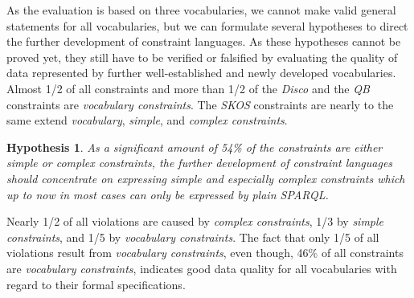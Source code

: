 \documentclass{llncs}
\newcommand{\tb}[1]{\todo[size=\small, color=green!40]{\textbf{Thomas:} #1}}
\newtheorem{hyp}{Hypothesis}
\begin{document}
As the evaluation is based on three vocabularies, 
we cannot make valid general statements for all vocabularies,
but we can formulate several hypotheses to direct the further development of constraint languages.
As these hypotheses cannot be proved yet, 
they still have to be verified or falsified
by evaluating the quality of data represented by further well-established and newly developed vocabularies.
Almost 1/2 of all constraints and more than 1/2 of the \emph{Disco} and the \emph{QB} constraints are \emph{vocabulary constraints}.
The \emph{SKOS} constraints are nearly to the same extend \emph{vocabulary}, \emph{simple}, and \emph{complex constraints}. 
\begin{hyp}
As a significant amount of 54\% of the constraints are either simple or complex constraints,
the further development of constraint languages should concentrate on expressing simple and especially complex constraints which up to now in most cases can only be expressed by plain SPARQL.  
\end{hyp} 

Nearly 1/2 of all violations are caused by \emph{complex constraints}, 1/3 by \emph{simple constraints}, and 1/5 by \emph{vocabulary constraints}.
The fact that only 1/5 of all violations result from \emph{vocabulary constraints}, 
even though, 46\% of all constraints are \emph{vocabulary constraints},
indicates good data quality for all vocabularies with regard to their formal specifications.
\end{document}
